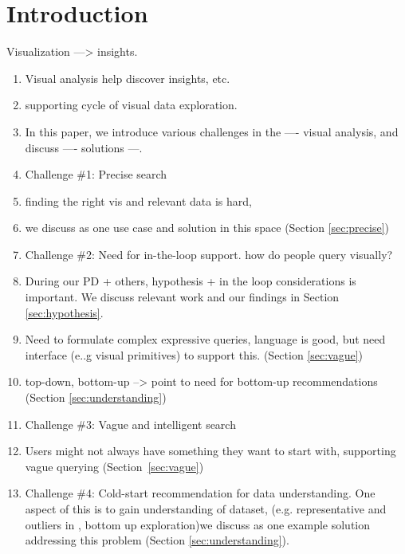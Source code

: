 \section{Introduction}
Visualization ---> insights. 



\begin{enumerate}
	\item Visual analysis help discover insights, etc.
	\item supporting cycle of visual data exploration. 
	\item In this paper, we introduce various challenges in the ---- visual analysis, and discuss ---- solutions ---.
	\item Challenge \#1: Precise search
		\item finding the right vis and relevant data is hard, 
		\item  we discuss \zv as one use case and solution in this space (Section \ref{sec:precise})
	\item Challenge \#2: Need for in-the-loop support. how do people query visually? 
		\item During our PD + others, hypothesis + in the loop considerations is important. We discuss relevant work and our findings in Section \ref{sec:hypothesis}.
		\item Need to formulate complex expressive queries, language is good, but need interface (e..g visual primitives) to support this. (Section \ref{sec:vague})
		\item top-down, bottom-up --> point to need for bottom-up recommendations (Section \ref{sec:understanding})
	\item Challenge \#3: Vague and intelligent search 
		\item Users might not always have something they want to start with, supporting vague querying (Section~\ref{sec:vague})
	\item Challenge \#4: Cold-start recommendation for data understanding. One aspect of this is to gain understanding of dataset, (e.g. representative and outliers in \zv, bottom up exploration)we discuss \sbd as one example solution addressing this problem (Section \ref{sec:understanding}).
\end{enumerate}
